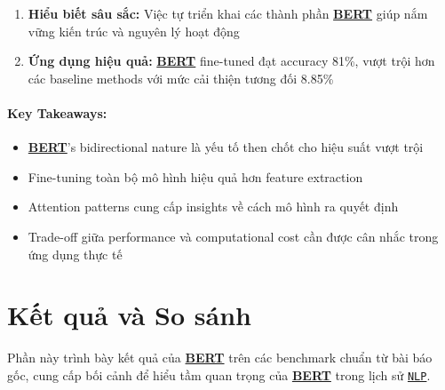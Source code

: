 \begin{enumerate}
    \item \textbf{Hiểu biết sâu sắc:} Việc tự triển khai các thành phần \hyperref[acro:bert]{\textbf{BERT}} giúp nắm vững kiến trúc và
    nguyên lý hoạt động
    \item \textbf{Ứng dụng hiệu quả:} \hyperref[acro:bert]{\textbf{BERT}} fine-tuned đạt accuracy 81\%, vượt trội hơn các baseline methods với mức cải thiện tương đối 8.85\%
\end{enumerate}

\paragraph{Key Takeaways:}
\begin{itemize}
    \item \hyperref[acro:bert]{\textbf{BERT}}'s bidirectional nature là yếu tố then chốt cho hiệu suất vượt trội
    \item Fine-tuning toàn bộ mô hình hiệu quả hơn feature extraction
    \item Attention patterns cung cấp insights về cách mô hình ra quyết định
    \item Trade-off giữa performance và computational cost cần được cân nhắc trong ứng dụng thực tế
\end{itemize}


\section{Kết quả và So sánh}
\label{sec:ket_qua_so_sanh}
Phần này trình bày kết quả của \hyperref[acro:bert]{\textbf{BERT}} trên các benchmark chuẩn từ bài báo gốc, cung cấp bối cảnh để hiểu tầm quan trọng của \hyperref[acro:bert]{\textbf{BERT}} trong lịch sử \hyperref[acro:nlp]{\texttt{NLP}}.
